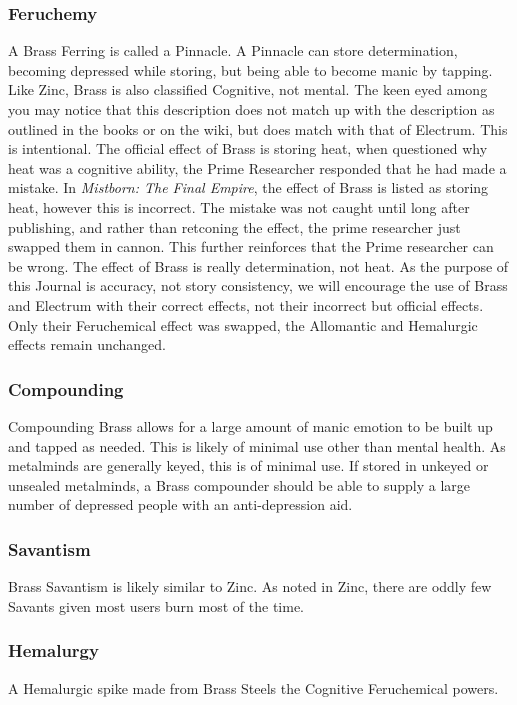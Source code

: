 \documentclass[conference]{IEEEtran}
\begin{document}
\subsubsection*{\textbf{Feruchemy}}
A Brass Ferring is called a Pinnacle.\cite{ARS}  A Pinnacle can store determination, becoming depressed while storing, but being able to become manic by tapping.  Like Zinc, Brass is also classified Cognitive, not mental.\cite{FE-TB}  
The keen eyed among you may notice that this description does not match up with the description as outlined in the books or on the wiki, but does match with that of Electrum.  This is intentional.  The official effect of Brass is storing heat, when questioned why heat was a cognitive ability, the Prime Researcher responded that he had made a mistake.\cite{mistake}  In \textit{Mistborn: The Final Empire}, the effect of Brass is listed as storing heat, however this is incorrect.  The mistake was not caught until long after publishing, and rather than retconing the effect, the prime researcher just swapped them in cannon.  This further reinforces that the Prime researcher can be wrong.\cite{unreliability}  The effect of Brass is really determination, not heat.  As the purpose of this Journal is accuracy, not story consistency, we will encourage the use of Brass and Electrum with their correct effects, not their incorrect but official effects.  Only their Feruchemical effect was swapped, the Allomantic and Hemalurgic effects remain unchanged.\\
\subsubsection*{\textbf{Compounding}}
Compounding Brass allows for a large amount of manic emotion to be built up and tapped as needed.  This is likely of minimal use other than mental health.  As metalminds are generally keyed, this is of minimal use.  If stored in unkeyed or unsealed metalminds, a Brass compounder should be able to supply a large number of depressed people with an anti-depression aid.\\
\subsubsection*{\textbf{Savantism}}
Brass Savantism is likely similar to Zinc.  As noted in Zinc, there are oddly few Savants given most users burn most of the time.\cite{WoA-CH11} \\
\subsubsection*{\textbf{Hemalurgy}}
A Hemalurgic spike made from Brass Steels the Cognitive Feruchemical powers.\cite{HE-TB}\\
\end{document}
